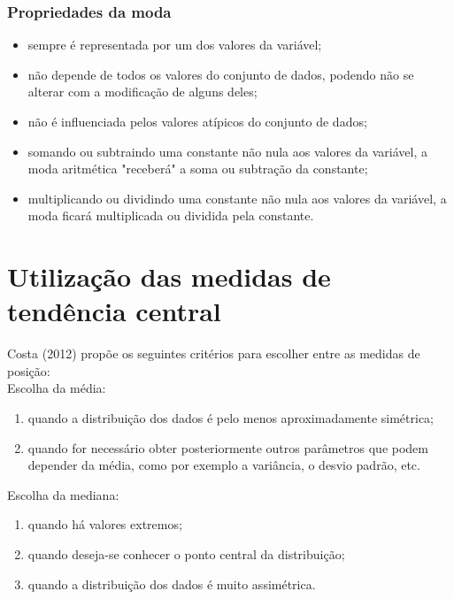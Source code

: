 \documentclass[11pt,fleqn]{book} %
\begin{document}
\subsubsection{Propriedades da moda}

\begin{itemize}
\item sempre é representada por um dos valores da variável;

\item não depende de todos os valores do conjunto de dados, podendo não se alterar com a modificação de alguns deles; 

\item não é influenciada pelos valores atípicos do conjunto de dados;

\item somando ou subtraindo uma constante não nula aos valores da variável, a moda aritmética "receberá" a soma ou subtração da constante;

\item multiplicando ou dividindo uma constante não nula aos valores da variável, a moda ficará multiplicada ou dividida pela constante.

\end{itemize}



\section{Utilização das medidas de tendência central}

Costa (2012) propõe os seguintes critérios para escolher entre as medidas de posição: \\

\noindent Escolha da média:
\begin{enumerate}
\item quando a distribuição dos dados é pelo menos aproximadamente simétrica;
\item quando for necessário obter posteriormente outros parâmetros que podem depender da média, como por exemplo a variância, o desvio padrão, etc.\\
\end{enumerate}

\noindent Escolha da mediana:
\begin{enumerate}
\item quando há valores extremos;
\item quando deseja-se conhecer o ponto central da distribuição;
\item quando a distribuição dos dados é muito assimétrica.\\
\end{enumerate}
\end{document}
